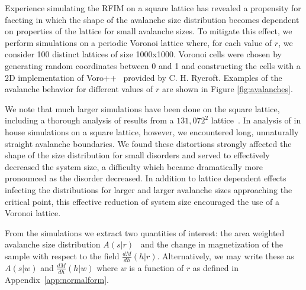 \documentclass[reprint,amsmath,amssymb,aps,floatfix]{revtex4-1}
\begin{document}
%
Experience simulating the RFIM on a square lattice has revealed a propensity for faceting in which the shape of the avalanche size distribution becomes dependent on properties of the lattice for small avalanche sizes.  To mitigate this effect, we perform simulations on a periodic Voronoi lattice where, for each value of $r$, we consider 100 distinct lattices of size 1000x1000.  Voronoi cells were chosen by generating random coordinates between 0 and 1 and constructing the cells with a 2D implementation of Voro++~\cite{Rycroft09} provided by C. H. Rycroft.  Examples of the avalanche behavior for different values of $r$ are shown in Figure \ref{fig:avalanches}. \par
%
We note that much larger simulations have been done on the square lattice, including a thorough analysis of results from a  $131,072^2$ lattice~\cite{Spasojevic11,Spasojevic11-2}. In analysis of in house simulations on a square lattice, however, we encountered long, unnaturally straight avalanche boundaries. We found these distortions strongly affected the shape of the size distribution for small disorders and served to effectively decreased the system size, a difficulty which became dramatically more pronounced as the disorder decreased. In addition to lattice dependent effects infecting the distributions for larger and larger avalanche sizes approaching the critical point, this effective reduction of system size encouraged the use of a Voronoi lattice. \par
%
From the simulations we extract two quantities of interest: the area weighted avalanche size distribution $A(s|r)$~\cite{Chen11} and the change in magnetization of the sample with respect to the field $\frac{dM}{dh}(h|r)$. Alternatively, we may write these as $A(s|w)$ and $\frac{dM}{dh}(h|w)$ where $w$ is a function of $r$ as defined in Appendix~\ref{app:normalform}. 
\end{document}

